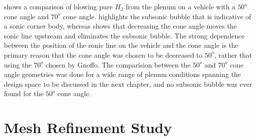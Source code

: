  shows a comparison of blowing pure $H_2$ from the
plenum on a vehicle with a $50^o$ cone angle and $70^o$ cone angle.
 highlights the subsonic bubble that is indicative of a
sonic corner body, whereas  shows that decreasing the cone
angle moves the sonic line upstream and eliminates the subsonic bubble.  The
strong dependence between the position of the sonic line on the vehicle and the
cone angle is the primary reason that the cone angle was chosen to be decreased
to $50^o$, rather that using the $70^o$ chosen by
Gnoffo\cite{gnoffo2016tapping}.  The comparision between the $50^o$ and
$70^o$ cone angle geometries was done for a wide range of plenum conditions
spanning the design space to be discussed in the next chapter, and no subsonic
bubble was ever found for the $50^o$ cone angle.

\section{Mesh Refinement Study}

